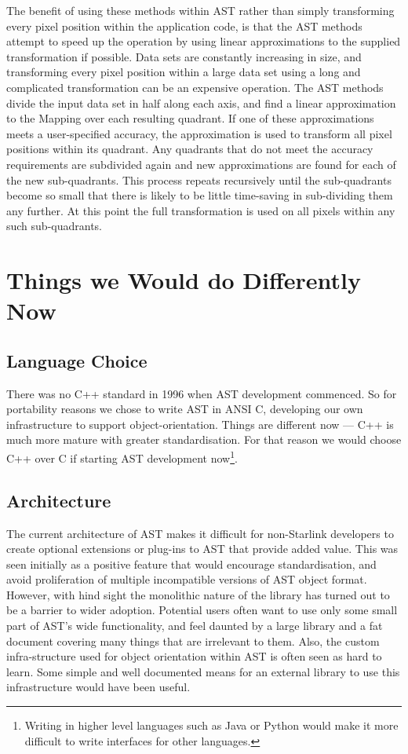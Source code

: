 \documentclass[final,authoryear,5p,times,twocolumn]{elsarticle}
\begin{document}
The benefit of using these methods within AST rather than simply
transforming every pixel position within the application code, is that
the AST methods attempt to speed up the operation by using linear
approximations to the supplied transformation if possible. Data sets are
constantly increasing in size, and transforming every pixel position
within a large data set using a long and complicated transformation can
be an expensive operation. The AST methods divide the input data set in
half along each axis, and find a linear approximation to the Mapping
over each resulting quadrant. If one of these approximations meets a
user-specified accuracy, the approximation is used to transform all pixel positions
within its quadrant. Any quadrants that do not meet the accuracy
requirements are subdivided again and new approximations are found
for each of the new sub-quadrants. This process repeats recursively until
the sub-quadrants become so small that there is likely to be little
time-saving in sub-dividing them any further. At this point the full
transformation is used on all pixels within any such sub-quadrants.


\section{Things we Would do Differently Now}

\subsection{Language Choice}

There was no C++ standard in 1996 when AST development commenced.
So for portability reasons we chose to write AST in ANSI C, developing
our own infrastructure to support object-orientation. Things are
different now --- C++ is much more mature with greater standardisation.
For that reason we would choose C++ over C if starting AST development
now\footnote{Writing in higher level languages such as Java or Python would make
it more difficult to write interfaces for other languages.}.

\subsection{Architecture}

The current architecture of AST makes it difficult for non-Starlink
developers to create optional extensions or plug-ins to AST that provide added
value. This was seen initially as a positive feature that would
encourage standardisation, and avoid proliferation of multiple incompatible
versions of AST object format. However, with hind sight the monolithic
nature of the library has turned out to be a barrier to wider adoption.
Potential users often want to use only some small part of AST's wide
functionality, and feel daunted by a large library and a fat document
covering many things that are irrelevant to them. Also, the custom infra-structure
used for object orientation within AST is often seen as hard to learn.
Some simple and well documented means for an external library to use this
infrastructure would have been useful.
\end{document}
